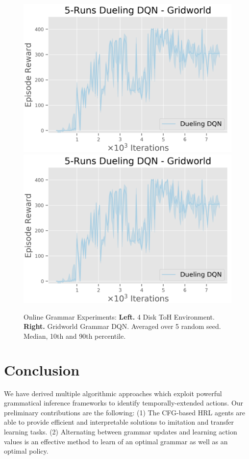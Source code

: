 \documentclass[10pt,letterpaper]{article}
\begin{document}
\begin{figure}[H]
  \includegraphics[width=\linewidth]{figures/mlp_ddqn_learning_curve}
\endminipage\hfill
{}
  \includegraphics[width=\linewidth]{figures/mlp_ddqn_learning_curve}
\endminipage
\caption{Online Grammar Experiments: \textbf{Left.} 4 Disk ToH Environment. \textbf{Right.} Gridworld Grammar DQN. Averaged over 5 random seed. Median, 10th and 90th percentile.}
\label{fig:online_grammar}
\end{figure}


\section{Conclusion}

We have derived multiple algorithmic approaches which exploit powerful grammatical inference frameworks to identify temporally-extended actions. Our preliminary contributions are the following:
%
(1) The CFG-based HRL agents are able to provide efficient and interpretable solutions to imitation and transfer learning tasks.
%
(2) Alternating between grammar updates and learning action values is an effective method to learn of an optimal grammar as well as an optimal policy.
\end{document}
